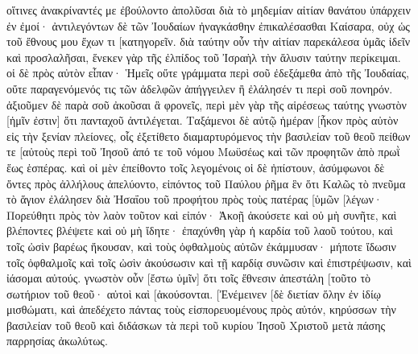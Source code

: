 οἵτινες ἀνακρίναντές με ἐβούλοντο ἀπολῦσαι διὰ τὸ μηδεμίαν αἰτίαν θανάτου ὑπάρχειν ἐν ἐμοί· 
ἀντιλεγόντων δὲ τῶν Ἰουδαίων ἠναγκάσθην ἐπικαλέσασθαι Καίσαρα, οὐχ ὡς τοῦ ἔθνους μου ἔχων τι [κατηγορεῖν. 
διὰ ταύτην οὖν τὴν αἰτίαν παρεκάλεσα ὑμᾶς ἰδεῖν καὶ προσλαλῆσαι, ἕνεκεν γὰρ τῆς ἐλπίδος τοῦ Ἰσραὴλ τὴν ἅλυσιν ταύτην περίκειμαι. 
οἱ δὲ πρὸς αὐτὸν εἶπαν· Ἡμεῖς οὔτε γράμματα περὶ σοῦ ἐδεξάμεθα ἀπὸ τῆς Ἰουδαίας, οὔτε παραγενόμενός τις τῶν ἀδελφῶν ἀπήγγειλεν ἢ ἐλάλησέν τι περὶ σοῦ πονηρόν. 
ἀξιοῦμεν δὲ παρὰ σοῦ ἀκοῦσαι ἃ φρονεῖς, περὶ μὲν γὰρ τῆς αἱρέσεως ταύτης γνωστὸν [ἡμῖν ἐστιν] ὅτι πανταχοῦ ἀντιλέγεται. 
Ταξάμενοι δὲ αὐτῷ ἡμέραν [ἧκον πρὸς αὐτὸν εἰς τὴν ξενίαν πλείονες, οἷς ἐξετίθετο διαμαρτυρόμενος τὴν βασιλείαν τοῦ θεοῦ πείθων τε [αὐτοὺς περὶ τοῦ Ἰησοῦ ἀπό τε τοῦ νόμου Μωϋσέως καὶ τῶν προφητῶν ἀπὸ πρωῒ ἕως ἑσπέρας. 
καὶ οἱ μὲν ἐπείθοντο τοῖς λεγομένοις οἱ δὲ ἠπίστουν, 
ἀσύμφωνοι δὲ ὄντες πρὸς ἀλλήλους ἀπελύοντο, εἰπόντος τοῦ Παύλου ῥῆμα ἓν ὅτι Καλῶς τὸ πνεῦμα τὸ ἅγιον ἐλάλησεν διὰ Ἠσαΐου τοῦ προφήτου πρὸς τοὺς πατέρας [ὑμῶν 
[λέγων· Πορεύθητι πρὸς τὸν λαὸν τοῦτον καὶ εἰπόν· Ἀκοῇ ἀκούσετε καὶ οὐ μὴ συνῆτε, καὶ βλέποντες βλέψετε καὶ οὐ μὴ ἴδητε· 
ἐπαχύνθη γὰρ ἡ καρδία τοῦ λαοῦ τούτου, καὶ τοῖς ὠσὶν βαρέως ἤκουσαν, καὶ τοὺς ὀφθαλμοὺς αὐτῶν ἐκάμμυσαν· μήποτε ἴδωσιν τοῖς ὀφθαλμοῖς καὶ τοῖς ὠσὶν ἀκούσωσιν καὶ τῇ καρδίᾳ συνῶσιν καὶ ἐπιστρέψωσιν, καὶ ἰάσομαι αὐτούς. 
γνωστὸν οὖν [ἔστω ὑμῖν] ὅτι τοῖς ἔθνεσιν ἀπεστάλη [τοῦτο τὸ σωτήριον τοῦ θεοῦ· αὐτοὶ καὶ [ἀκούσονται. 
[Ἐνέμεινεν [δὲ διετίαν ὅλην ἐν ἰδίῳ μισθώματι, καὶ ἀπεδέχετο πάντας τοὺς εἰσπορευομένους πρὸς αὐτόν, 
κηρύσσων τὴν βασιλείαν τοῦ θεοῦ καὶ διδάσκων τὰ περὶ τοῦ κυρίου Ἰησοῦ Χριστοῦ μετὰ πάσης παρρησίας ἀκωλύτως. 
